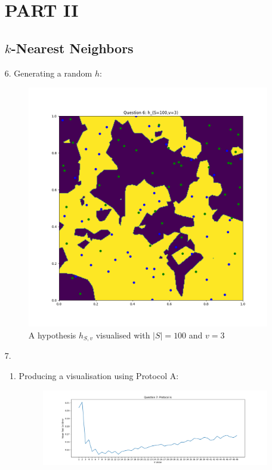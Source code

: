 \documentclass[12pt]{article}
\begin{document}
\begin{enumerate}[leftmargin=\labelsep]
\section{PART II}
\subsection{$k$-Nearest Neighbors}
\item[6.]Generating a random $h$:
            \begin{figure}[h]
            \centering
            \includegraphics[scale=0.5]{outputs/q6/q6}
            \caption{A hypothesis $h_{S,v}$ visualised with $|S|=100$ and $v=3$}
            \label{fig:6a}
            \end{figure}
\newpage
\item[7.]
    \begin{enumerate}
        \item Producing a visualisation using Protocol A:
            \begin{figure}[h]
            \centering
            \includegraphics[scale=0.5]{outputs/q7/q7}

\end{figure}
\end{enumerate}
\end{enumerate}
\end{document}
